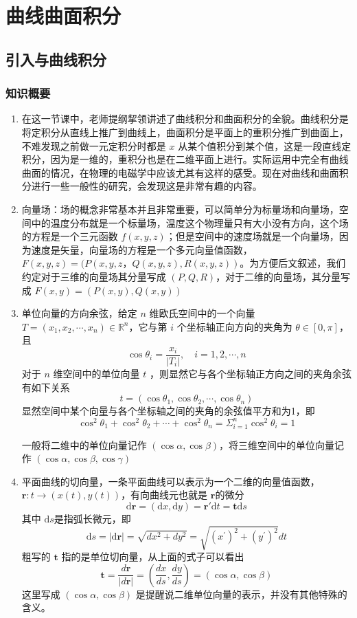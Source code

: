 \section{曲线曲面积分}
\subsection{引入与曲线积分}
\subsubsection{知识概要}
\begin{enumerate}
    \item 在这一节课中，老师提纲挈领讲述了曲线积分和曲面积分的全貌。曲线积分是将定积分从直线上推广到曲线上，曲面积分是平面上的重积分推广到曲面上，不难发现之前做一元定积分时都是 $x$ 从某个值积分到某个值，这是一段直线定积分，因为是一维的，重积分也是在二维平面上进行。实际运用中完全有曲线曲面的情况，在物理的电磁学中应该尤其有这样的感受。现在对曲线和曲面积分进行一些一般性的研究，会发现这是非常有趣的内容。

    \item 向量场：场的概念非常基本并且非常重要，可以简单分为标量场和向量场，空间中的温度分布就是一个标量场，温度这个物理量只有大小没有方向，这个场的方程是一个三元函数 $f(x,y,z)$；但是空间中的速度场就是一个向量场，因为速度是矢量，向量场的方程是一个多元向量值函数，$F(x,y,z) = (P(x,y,z，Q(x,y,z), R(x,y,z))$。为方便后文叙述，我们约定对于三维的向量场其分量写成 $(P,Q,R)$，对于二维的向量场，其分量写成 $F(x,y)= ( P(x,y), Q(x,y) )$

    \item 单位向量的方向余弦，给定 $n$ 维欧氏空间中的一个向量 $T = (x_1, x_2, \cdots, x_n) \in \mathbb{R}^n$，它与第 $i$ 个坐标轴正向方向的夹角为 $\theta \in [0, \pi]$，且
    $$
    \cos \theta _i = \frac{x_i}{|T _i|}, \quad i=1,2,\cdots, n
    $$
    对于 $n$ 维空间中的单位向量 $t$ ，则显然它与各个坐标轴正方向之间的夹角余弦有如下关系
    $$
    t = (\cos \theta _1, \cos \theta _2, \cdots, \cos \theta _n)
    $$
    显然空间中某个向量与各个坐标轴之间的夹角的余弦值平方和为1，即
    \[
        \cos^2\theta_1+\cos^2\theta_2+\cdots+\cos^2\theta_n= \Sigma_{i=1}^n \cos ^2 \theta _i = 1 
    \]
    
    一般将二维中的单位向量记作 $(\cos \alpha, \cos \beta)$，将三维空间中的单位向量记作 $(\cos \alpha, \cos \beta, \cos \gamma)$

    \item 平面曲线的切向量，一条平面曲线可以表示为一个二维的向量值函数，$\mathbf{r}: t \to (x(t), y(t))$，有向曲线元也就是 $\mathbf{r}$的微分
    \[
        \mathrm{d} \mathbf{r} = (\mathrm{d}x, \mathrm{d}y) = \mathbf{r}' \mathrm{d}t = \mathbf{t} \mathrm{d}s
    \]
    其中 $\mathrm{d}s$是指弧长微元，即
    \[
    \mathrm{d}s = |\mathrm{d} \mathbf{r}| = \sqrt{dx^2+dy^2}=\sqrt{(x^{\prime})^2+(y^{\prime})^2}dt
    \]
    粗写的 $\mathbf{t}$ 指的是单位切向量，从上面的式子可以看出
    \[
        \mathbf t=\frac{d\mathbf r}{|d\mathbf r|}=\left(\frac{dx}{ds},\frac{dy}{ds}\right)=(\cos\alpha,\cos\beta)
    \]
    这里写成 $(\cos\alpha,\cos\beta)$ 是提醒说二维单位向量的表示，并没有其他特殊的含义。


\end{enumerate}
